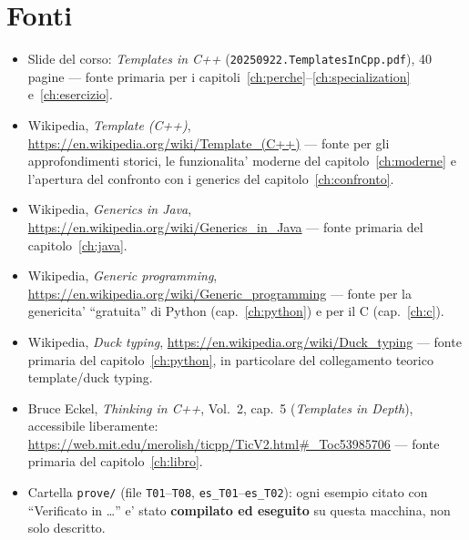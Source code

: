 \documentclass{report}
\newcommand{\code}[1]{\texttt{\small #1}}
\begin{document}
\section*{Fonti}

\begin{itemize}
    \item Slide del corso: \emph{Templates in C++} (\code{20250922.TemplatesInCpp.pdf}), 40 pagine --- fonte primaria per i capitoli~\ref{ch:perche}--\ref{ch:specialization} e~\ref{ch:esercizio}.
    \item Wikipedia, \emph{Template (C++)}, \url{https://en.wikipedia.org/wiki/Template_(C++)} --- fonte per gli approfondimenti storici, le funzionalita' moderne del capitolo~\ref{ch:moderne} e l'apertura del confronto con i generics del capitolo~\ref{ch:confronto}.
    \item Wikipedia, \emph{Generics in Java}, \url{https://en.wikipedia.org/wiki/Generics_in_Java} --- fonte primaria del capitolo~\ref{ch:java}.
    \item Wikipedia, \emph{Generic programming}, \url{https://en.wikipedia.org/wiki/Generic_programming} --- fonte per la genericita' ``gratuita'' di Python (cap.~\ref{ch:python}) e per il C (cap.~\ref{ch:c}).
    \item Wikipedia, \emph{Duck typing}, \url{https://en.wikipedia.org/wiki/Duck_typing} --- fonte primaria del capitolo~\ref{ch:python}, in particolare del collegamento teorico template/duck typing.
    \item Bruce Eckel, \emph{Thinking in C++}, Vol.~2, cap.~5
          (\emph{Templates in Depth}), accessibile liberamente:
          \url{https://web.mit.edu/merolish/ticpp/TicV2.html\#_Toc53985706}
          --- fonte primaria del capitolo~\ref{ch:libro}.
    \item Cartella \code{prove/} (file \code{T01}--\code{T08},
          \code{es\_T01}--\code{es\_T02}): ogni esempio citato con
          ``Verificato in \dots'' e' stato \textbf{compilato ed eseguito}
          su questa macchina, non solo descritto.
\end{itemize}
\end{document}
